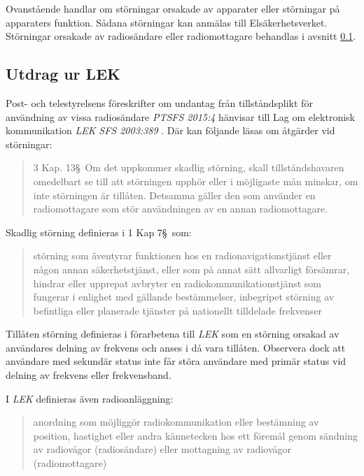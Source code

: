 Ovanstående handlar om störningar orsakade av apparater eller störningar på
apparaters funktion.
Sådana störningar kan anmälas till Elsäkerhetsverket.
Störningar orsakade av radiosändare eller radiomottagare behandlas i avsnitt
\ref{LEK}.


\subsection{Utdrag ur LEK}
\label{LEK}

Post- och telestyrelsens föreskrifter om undantag från tillståndsplikt för
användning av vissa radiosändare \emph{PTSFS 2015:4} \cite{PTSFS2015:4} hänvisar
till Lag om elektronisk kommunikation \emph{LEK} \emph{SFS 2003:389}
\cite{SFS2003:389}.
Där kan följande läsas om åtgärder vid störningar:

\begin{quote}
	3 Kap. 13\S~Om det uppkommer skadlig störning, skall tillståndshavaren
	omedelbart se till att störningen upphör eller i möjligaste mån minskar, om
	inte störningen är tillåten.
	Detsamma gäller den som använder en radiomottagare som stör användningen av en
	annan radiomottagare.
\end{quote}

Skadlig störning definieras i 1 Kap 7\S~som:
\begin{quote}
	störning som äventyrar funktionen hos en radionavigationstjänst eller någon
	annan säkerhetstjänst, eller som på annat sätt allvarligt försämrar,
	hindrar eller upprepat avbryter en radiokommunikationstjänst som fungerar i
	enlighet med gällande bestämmelser, inbegripet störning av befintliga eller
	planerade tjänster på nationellt tilldelade frekvenser
\end{quote}

Tillåten störning definieras i förarbetena till \emph{LEK} som en störning
orsakad av användares delning av frekvens och anses i då vara tillåten.
Observera dock att användare med sekundär status inte får störa användare med
primär status vid delning av frekvens eller frekvensband.

I \emph{LEK} definieras även radioanläggning:
\begin{quote}
	anordning som möjliggör radiokommunikation eller bestämning av position,
	hastighet eller andra kännetecken hos ett föremål genom sändning av radiovågor
	(radiosändare) eller mottagning av radiovågor (radiomottagare)
\end{quote}

